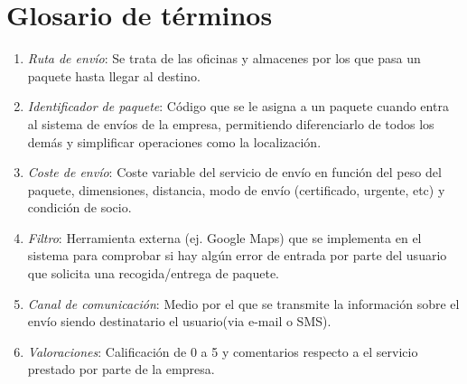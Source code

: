 \newpage

\section{Glosario de términos}
	\begin{enumerate}
		\item \textit{Ruta de envío}: Se trata de las oficinas y almacenes por los que pasa un paquete hasta llegar al destino.
		\item \textit{Identificador de paquete}: Código que se le asigna a un paquete cuando entra al sistema de envíos de la empresa, permitiendo diferenciarlo de todos los demás y simplificar operaciones como la localización.
		\item \textit{Coste de envío}: Coste variable del servicio de envío en función del peso del paquete, dimensiones, distancia, modo de envío (certificado, urgente, etc) y condición de socio.
		\item \textit{Filtro}: Herramienta externa (ej. Google Maps) que se implementa  en el sistema para comprobar si hay algún error de entrada por parte del usuario que solicita una recogida/entrega de paquete.
		\item \textit{Canal de comunicación}: Medio por el que se transmite la información sobre el envío siendo destinatario el usuario(via e-mail o SMS).
		\item \textit{Valoraciones}: Calificación de 0 a 5 y comentarios respecto a el servicio prestado por parte de la empresa.
		
 	\end{enumerate}
\newpage


